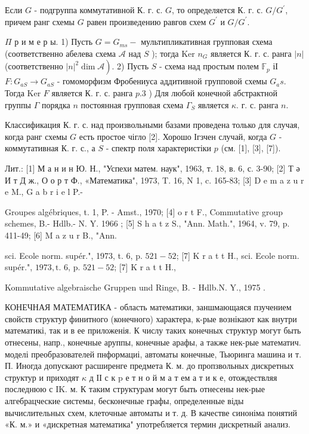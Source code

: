 \documentclass[10pt]{article}
\begin{document}
Если $G$ - подгруппа коммутативной К. г. с. $G$, то определяется К. г. с. $G / G^{\prime}$, причем ранг схемы $G$ равен произведению равгов схем $G^{\prime}$ и $G / G^{\prime}$.



$\Pi$ р и м е р ы. 1) Пусть $G=G_{m s}-$ мультипликативная групповая схема (соответственно абелева схема $\mathcal{A}$ над $S$ ); тогда Ker $n_{G}$ является К. г. с. ранга $|n|$ (соответственно $\left.|n|^{2} \operatorname{dim} \mathcal{A}\right)$. 2) Пусть $S$ - схема над простым полем $\mathbb{F}_{p}$ іІ $F: G_{a S} \longrightarrow G_{a S}$ - гомоморфизм Фробениуса аддитивной групповой схемы $G_{a} s$. Тогда Ker $F$ является К. г. с. ранга $p .3$ ) Для любой конечной абстрактной группы $\Gamma$ порядка $n$ постоянная групповая схема $\Gamma_{S}$ является $\kappa$. г. с. ранга $n$.



Классификация К. г. с. над произвольными базами проведена только для случая, когда ранг схемы $G$ есть простое чігло [2]. Хорошо Ігзчен случай, когда $G$ - коммутативная К. г. с., а $S$ - спектр поля характеристіки $p$ (см. [1], [3], [7]).



Лит.: [1] М а н и н Ю. Н., "Успехи матем. наук", 1963, т. 18, в. 6, с. 3-90; [2] Т ә И т Д ж., О о р т Ф., «Математика", 1973, T. 16, N 1, c. 165-83; [3] D e m a z u r e M., G a b r i e l P.-

Groupes algébriques, t. 1, P. - Amst., 1970; [4] o r t F., Commutative group schemes, B.- Hdlb.- N. Y. 1966 ; [5] S h a t z S., "Ann. Math.", 1964, v. 79, p. 411-49; [6] M a z u r B., "Ann.

sci. Ecole norm. supér.", 1973, t. 6, p. $521-52$; [7] K r a t t H., sci. Ecole norm. supér.", $1973, \mathrm{t}$. 6, p. $521-52$; [7] K r a t t H.,

Kommutative algebraische Gruppen und Ringe, B. - Hdlb.N. Y., 1975 .



КОНЕЧНАЯ МАТЕМАТИКА - область математики, заншмающаяся пзучением свойств структур финитного (конечного) характера, к-рые вознікают как внутри математикі, так и в ее приложенія. К числу таких конечных структур могут быть отнесены, напр., конечные аруппы, конечные арафы, а также нек-рые математич. моделі преобразователей пнформациі, автоматы конечные, Тьюринга машина и т. П. Иногда допускают расширенге предмета К. м. до пропзвольных дискретных структур и приходят $\kappa$ д ІІ с к $\mathrm{p}$ е т н о й м а т ем а т и к е, отождествляя последнюю с IK. м. К таким структурам могут быть отнесены нек-рые алгебрацческие системы, бесконечные графы, определенные віды вычислительных схем, клеточные автоматы и т. д. В качестве синоніма понятий «К. м.» и «дискретная математика" употребляется термин дискретный анализ.
\end{document}
